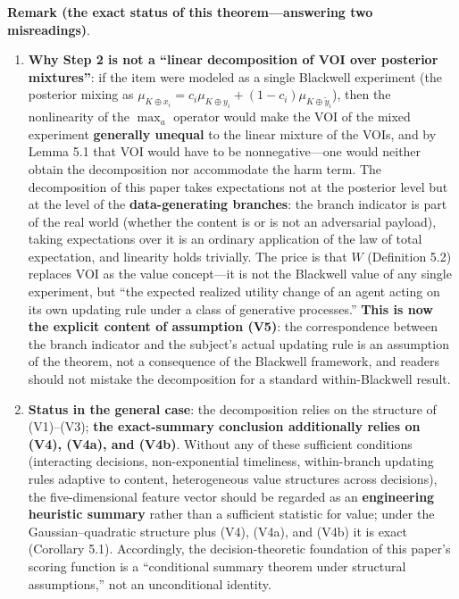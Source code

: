 \documentclass[
  11pt]{article}
\providecommand{\tightlist}{%
  \setlength{\itemsep}{0pt}\setlength{\parskip}{0pt}}
\begin{document}
\textbf{Remark (the exact status of this theorem---answering two
misreadings)}.

\begin{enumerate}
\def\labelenumi{\arabic{enumi}.}
\tightlist
\item
  \textbf{Why Step 2 is not a ``linear decomposition of VOI over
  posterior mixtures''}: if the item were modeled as a single Blackwell
  experiment (the posterior mixing as
  \(\mu_{K\oplus x_i} = c_i\mu_{K\oplus y_i} + (1-c_i)\mu_{K\oplus\tilde y_i}\)),
  then the nonlinearity of the \(\max_a\) operator would make the VOI of
  the mixed experiment \textbf{generally unequal} to the linear mixture
  of the VOIs, and by Lemma 5.1 that VOI would have to be
  nonnegative---one would neither obtain the decomposition nor
  accommodate the harm term. The decomposition of this paper takes
  expectations not at the posterior level but at the level of the
  \textbf{data-generating branches}: the branch indicator is part of the
  real world (whether the content is or is not an adversarial payload),
  taking expectations over it is an ordinary application of the law of
  total expectation, and linearity holds trivially. The price is that
  \(W\) (Definition 5.2) replaces VOI as the value concept---it is not
  the Blackwell value of any single experiment, but ``the expected
  realized utility change of an agent acting on its own updating rule
  under a class of generative processes.'' \textbf{This is now the
  explicit content of assumption (V5)}: the correspondence between the
  branch indicator and the subject's actual updating rule is an
  assumption of the theorem, not a consequence of the Blackwell
  framework, and readers should not mistake the decomposition for a
  standard within-Blackwell result.
\item
  \textbf{Status in the general case}: the decomposition relies on the
  structure of (V1)--(V3); \textbf{the exact-summary conclusion
  additionally relies on (V4), (V4a), and (V4b)}. Without any of these
  sufficient conditions (interacting decisions, non-exponential
  timeliness, within-branch updating rules adaptive to content,
  heterogeneous value structures across decisions), the five-dimensional
  feature vector should be regarded as an \textbf{engineering heuristic
  summary} rather than a sufficient statistic for value; under the
  Gaussian--quadratic structure plus (V4), (V4a), and (V4b) it is exact
  (Corollary 5.1). Accordingly, the decision-theoretic foundation of
  this paper's scoring function is a ``conditional summary theorem under
  structural assumptions,'' not an unconditional identity.

\end{enumerate}
\end{document}

